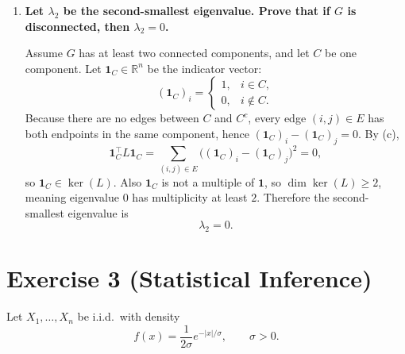 \documentclass[11pt]{article}
\newcommand{\R}{\mathbb{R}}
\begin{document}
\begin{enumerate}[label=(\alph*)]
From (c),
\[
x^\top L x = \sum_{(i,j)\in E}(x_i-x_j)^2 \ge 0\quad\text{for all }x,
\]
so $L\succeq 0$ (positive semidefinite), hence all eigenvalues are $\ge 0$.
But $L\bm 1=0$, so $0$ is an eigenvalue. Therefore the smallest eigenvalue is
\[
\lambda_1=0.
\]

\item \textbf{Let $\lambda_2$ be the second-smallest eigenvalue. Prove that if $G$ is disconnected, then $\lambda_2=0$.}

Assume $G$ has at least two connected components, and let $C$ be one component. Let $\bm 1_C\in\R^n$ be the indicator vector:
\[
(\bm 1_C)_i=
\begin{cases}
1,& i\in C,\\
0,& i\notin C.
\end{cases}
\]
Because there are no edges between $C$ and $C^c$, every edge $(i,j)\in E$ has both endpoints in the same component, hence $(\bm 1_C)_i-(\bm 1_C)_j=0$. By (c),
\[
\bm 1_C^\top L \bm 1_C = \sum_{(i,j)\in E}\bigl((\bm 1_C)_i-(\bm 1_C)_j\bigr)^2=0,
\]
so $\bm 1_C\in \ker(L)$. Also $\bm 1_C$ is not a multiple of $\bm 1$, so $\dim \ker(L)\ge 2$, meaning eigenvalue $0$ has multiplicity at least $2$. Therefore the second-smallest eigenvalue is
\[
\lambda_2=0.
\]
\end{enumerate}

\section*{Exercise 3 (Statistical Inference)}

Let $X_1,\dots,X_n$ be i.i.d.\ with density
\[
f(x)=\frac{1}{2\sigma}e^{-|x|/\sigma},\qquad \sigma>0.
\]
\end{document}
